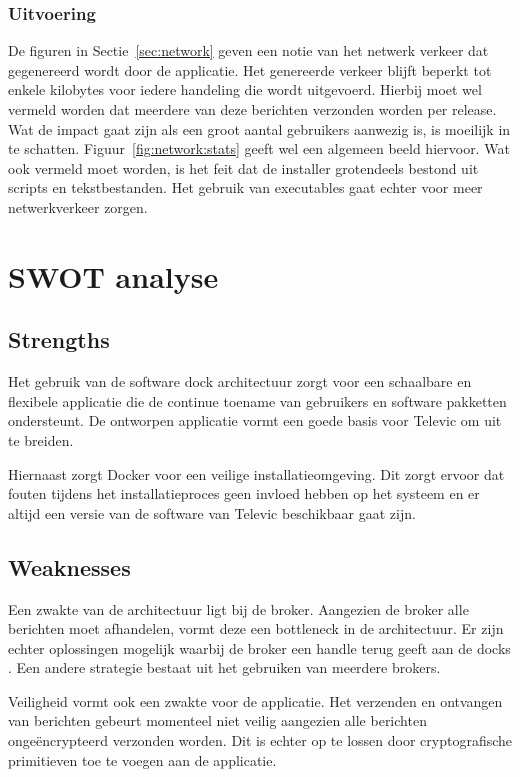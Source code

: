 \subsubsection{Uitvoering}
De figuren in Sectie~\ref{sec:network} geven een notie van het netwerk verkeer dat gegenereerd wordt door de applicatie.
Het genereerde verkeer blijft beperkt tot enkele kilobytes voor iedere handeling die wordt uitgevoerd.
Hierbij moet wel vermeld worden dat meerdere van deze berichten verzonden worden per release.
Wat de impact gaat zijn als een groot aantal gebruikers aanwezig is, is moeilijk in te schatten.
Figuur~\ref{fig:network:stats} geeft wel een algemeen beeld hiervoor.
Wat ook vermeld moet worden, is het feit dat de installer grotendeels bestond uit scripts en tekstbestanden.
Het gebruik van executables gaat echter voor meer netwerkverkeer zorgen.

\section{SWOT analyse}
\subsection{Strengths}
Het gebruik van de software dock architectuur zorgt voor een schaalbare en flexibele applicatie die de continue toename van gebruikers en software pakketten ondersteunt.
De ontworpen applicatie vormt een goede basis voor Televic om uit te breiden.

Hiernaast zorgt Docker voor een veilige installatieomgeving.
Dit zorgt ervoor dat fouten tijdens het installatieproces geen invloed hebben op het systeem en er altijd een versie van de software van Televic beschikbaar gaat zijn.

\subsection{Weaknesses}
Een zwakte van de architectuur ligt bij de broker.
Aangezien de broker alle berichten moet afhandelen, vormt deze een bottleneck in de architectuur.
Er zijn echter oplossingen mogelijk waarbij de broker een handle terug geeft aan de docks \citep{adler1995distributed}. 
Een andere strategie bestaat uit het gebruiken van meerdere brokers.

Veiligheid vormt ook een zwakte voor de applicatie.
Het verzenden en ontvangen van berichten gebeurt momenteel niet veilig aangezien alle berichten ongeëncrypteerd verzonden worden.
Dit is echter op te lossen door cryptografische primitieven toe te voegen aan de applicatie.

